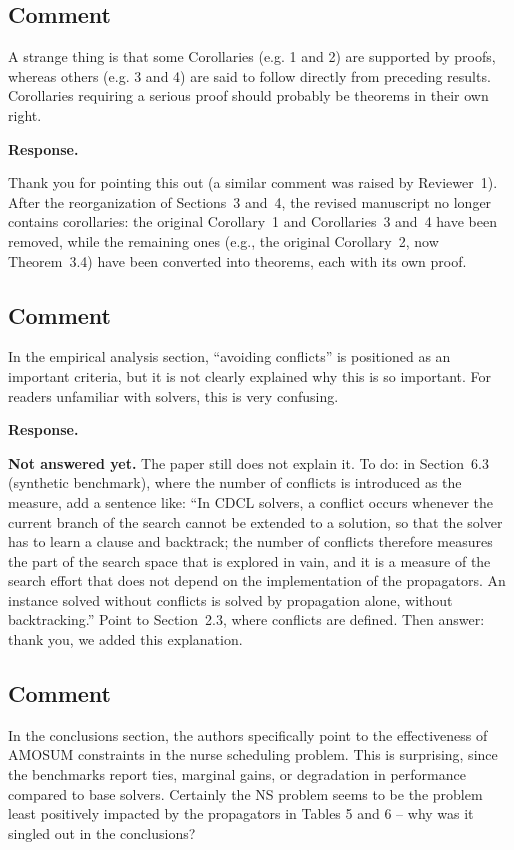 \documentclass[11pt]{article}
\theoremstyle{definition}
\newcommand{\reviewertodo}{\subsection{\color{red}Comment}}
\newcommand{\revieweranswered}{\subsection{Comment}}
\newenvironment{response}{
    \color{blue} \textbf{Response.}
}{
}
\newcommand{\notanswered}[1]{{\color{red}\textbf{Not answered yet.} #1}}
\begin{document}
\vspace{0.5cm}
\revieweranswered
A strange thing is that some Corollaries (e.g. 1 and 2) are supported by proofs, whereas others (e.g. 3 and 4) are said to follow directly from preceding results. Corollaries requiring a serious proof should probably be theorems in their own right.

\begin{response}
Thank you for pointing this out (a similar comment was raised by Reviewer~1).
After the reorganization of Sections~3 and~4, the revised manuscript no longer contains corollaries: the original Corollary~1 and Corollaries~3 and~4 have been removed, while the remaining ones (e.g., the original Corollary~2, now Theorem~3.4) have been converted into theorems, each with its own proof.
\end{response}

\vspace{0.5cm}
\reviewertodo
In the empirical analysis section, ``avoiding conflicts'' is positioned as an important criteria, but it is not clearly explained why this is so important. For readers unfamiliar with solvers, this is very confusing.

\begin{response}
\notanswered{The paper still does not explain it.
To do: in Section~6.3 (synthetic benchmark), where the number of conflicts is introduced as the measure, add a sentence like: ``In CDCL solvers, a conflict occurs whenever the current branch of the search cannot be extended to a solution, so that the solver has to learn a clause and backtrack; the number of conflicts therefore measures the part of the search space that is explored in vain, and it is a measure of the search effort that does not depend on the implementation of the propagators. An instance solved without conflicts is solved by propagation alone, without backtracking.'' Point to Section~2.3, where conflicts are defined.
Then answer: thank you, we added this explanation.}
\end{response}

\vspace{0.5cm}
\reviewertodo
In the conclusions section, the authors specifically point to the effectiveness of AMOSUM constraints in the nurse scheduling problem. This is surprising, since the benchmarks report ties, marginal gains, or degradation in performance compared to base solvers. Certainly the NS problem seems to be the problem least positively impacted by the propagators in Tables 5 and 6 -- why was it singled out in the conclusions?
\end{document}
